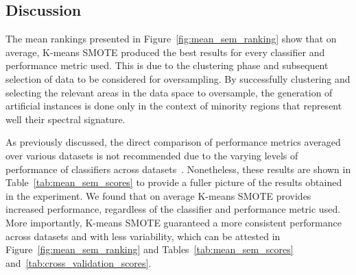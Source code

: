 \documentclass[information,article,submit,moreauthors,pdftex]{Definitions/mdpi}
\begin{document}
\begin{table}[H]
    \caption{
        \textit{p-values} of the Wilcoxon signed-rank test. Boldface values
        are statistically significant at a significance level of $\alpha =
        0.05$.
    \vspace{-.6cm}}\label{tab:wilcoxon_test}
\end{table}
\begin{paracol}{2}
\linenumbers
\switchcolumn

\subsection{Discussion}

The mean rankings presented in
Figure~\ref{fig:mean_sem_ranking} show that on average,
K-means SMOTE produced the best results for every classifier and performance
metric used. This is due to the clustering phase and subsequent selection of
data to be considered for oversampling. By successfully clustering and
selecting the relevant areas in the data space to oversample, the generation
of artificial instances is done only in the context of minority regions that
represent well their spectral signature.

As previously discussed, the direct comparison of performance metrics averaged
over various datasets is not recommended due to the varying levels of
performance of classifiers across datasets~\citep{demvsar2006}. Nonetheless,
these results are shown in Table~\ref{tab:mean_sem_scores} to provide a fuller
picture of the results obtained in the experiment. We found that on average
K-means SMOTE provides increased performance, regardless of the classifier and
performance metric used. More importantly, K-means SMOTE guaranteed a more
consistent performance across datasets and with less variability, which can be
attested in Figure~\ref{fig:mean_sem_ranking} and
Tables~\ref{tab:mean_sem_scores} and~\ref{tab:cross_validation_scores}.


\end{paracol}
\end{document}
